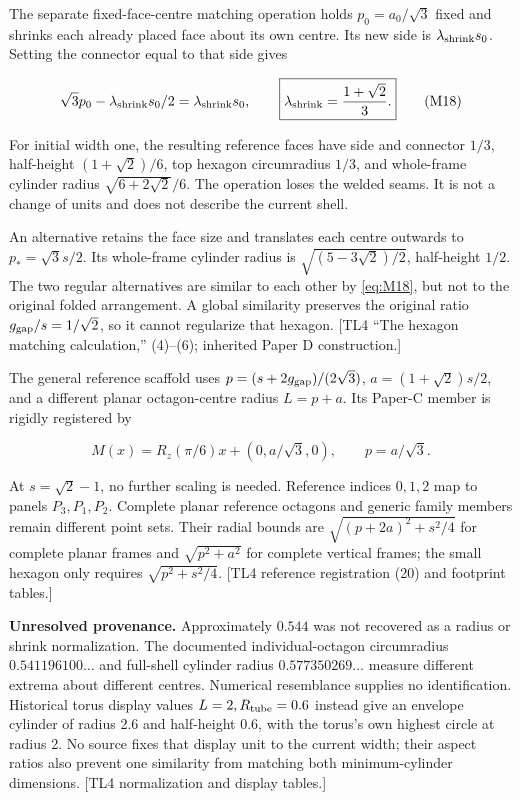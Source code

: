 \documentclass[11pt,a4paper]{article}
\begin{document}
The separate fixed-face-centre matching operation holds \(p_0=a_0/\sqrt3\) fixed and shrinks each already placed face about its own centre. Its new side is \(\lambda_{\rm shrink}s_0\). Setting the connector equal to that side gives

\[
\sqrt3p_0-\lambda_{\rm shrink}s_0/2=\lambda_{\rm shrink}s_0,
\qquad
\boxed{\lambda_{\rm shrink}=\frac{1+\sqrt2}{3}.}
\tag{M18}\label{eq:M18}
\]

For initial width one, the resulting reference faces have side and connector \(1/3\), half-height \((1+\sqrt2)/6\), top hexagon circumradius \(1/3\), and whole-frame cylinder radius \(\sqrt{6+2\sqrt2}/6\). The operation loses the welded seams. It is not a change of units and does not describe the current shell.

An alternative retains the face size and translates each centre outwards to \(p_*=\sqrt3s/2\). Its whole-frame cylinder radius is \(\sqrt{(5-3\sqrt2)/2}\), half-height \(1/2\). The two regular alternatives are similar to each other by \eqref{eq:M18}, but not to the original folded arrangement. A global similarity preserves the original ratio \(g_{\rm gap}/s=1/\sqrt2\), so it cannot regularize that hexagon. [TL4 \textquotedblleft{}The hexagon matching calculation,\textquotedblright{} (4)--(6); inherited Paper D construction.]

The general reference scaffold uses \(p=(s+2g_{\rm gap})/(2\sqrt3)\), \(a=(1+\sqrt2)s/2\), and a different planar octagon-centre radius \(L=p+a\). Its Paper-C member is rigidly registered by

\[
M(x)=R_z(\pi/6)x+(0,a/\sqrt3,0),\qquad p=a/\sqrt3.
\tag{M19}\label{eq:M19}
\]

At \(s=\sqrt2-1\), no further scaling is needed. Reference indices \(0,1,2\) map to panels \(P_3,P_1,P_2\). Complete planar reference octagons and generic family members remain different point sets. Their radial bounds are \(\sqrt{(p+2a)^2+s^2/4}\) for complete planar frames and \(\sqrt{p^2+a^2}\) for complete vertical frames; the small hexagon only requires \(\sqrt{p^2+s^2/4}\). [TL4 reference registration (20) and footprint tables.]

\textbf{Unresolved provenance.} Approximately \(0.544\) was not recovered as a radius or shrink normalization. The documented individual-octagon circumradius \(0.541196100\ldots\) and full-shell cylinder radius \(0.577350269\ldots\) measure different extrema about different centres. Numerical resemblance supplies no identification. Historical torus display values \(L=2,R_{\rm tube}=0.6\) instead give an envelope cylinder of radius 2.6 and half-height 0.6, with the torus's own highest circle at radius 2. No source fixes that display unit to the current width; their aspect ratios also prevent one similarity from matching both minimum-cylinder dimensions. [TL4 normalization and display tables.]
\end{document}

